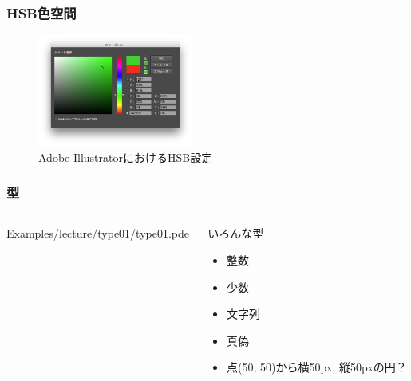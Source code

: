 \documentclass[10pt, dvipdfmx]{beamer}
\begin{document}
        \begin{frame}
            \frametitle{HSB色空間}
                \begin{figure}[htb]
                    \includegraphics[width=51mm]{images/10.png}
                    \caption{Adobe IllustratorにおけるHSB設定}
                    \label{fig:10}
                \end{figure}
        \end{frame}

        \begin{frame}
            \frametitle{型}
            \begin{columns}[c]
                \begin{column}{0.50\textwidth}
                    \tiny
                    Examples/lecture/type01/type01.pde
                    \scriptsize
                \end{column}
                \begin{column}{0.50\textwidth}
                    \begin{block}{いろんな型}
                        \begin{itemize}
                            \item 整数
                            \item 少数
                            \item 文字列
                            \item 真偽
                            \item 点(50, 50)から横50px, 縦50pxの円？
                        \end{itemize}
                    \end{block}
                \end{column}
            \end{columns}
        \end{frame}
\end{document}
